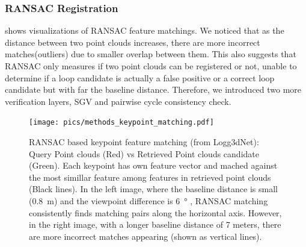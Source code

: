 \subsubsection*{\textbf{RANSAC Registration}}
 shows visualizations of RANSAC feature matchings. We noticed that as the distance between two point clouds increases, there are more incorrect matches(outliers) due to smaller overlap between them. This also suggests that RANSAC only measures if two point clouds can be registered or not, unable to determine if a loop candidate is actually a false positive or a correct loop candidate but with far the baseline distance. Therefore, we introduced two more verification layers, SGV and pairwise cycle consistency check. 

\begin{figure}[htbp]
  \centering
  \texttt{[image: pics/methods\_keypoint\_matching.pdf]}
  \caption{RANSAC based keypoint feature matching (from Logg3dNet): Query Point clouds (Red) vs Retrieved Point clouds candidate (Green). Each keypoint has own feature vector and mached against the most simillar feature among features in retrieved point clouds (Black lines). In the left image, where the baseline distance is small (\SI{0.8}{\meter}) and the viewpoint difference is \SI{6}{\degree} , RANSAC matching consistently finds matching pairs along the horizontal axis. However, in the right image, with a longer baseline distance of 7 meters, there are more incorrect matches appearing (shown as vertical lines).   }
  \label{fig:RANSAC_keypoint_matching}
\end{figure}



